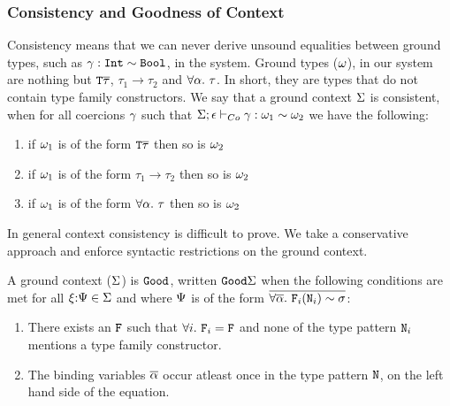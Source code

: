 \documentclass[format=sigplan,manuscript,review,screen,nonacm,margin=1in]{acmart}
\begin{document}
\subsubsection{Consistency and Goodness of Context}\label{subsec:tf-closed-consistency}
Consistency means that we can never derive unsound equalities between ground types,
such as $\gamma:\texttt{Int}\mathrel{\sim}\texttt{Bool}$, in the system. Ground types ($\omega$), in our system are
nothing but $\texttt{T}\overline{\tau}$, $\tau_1\to\tau_2$ and $\forall\alpha.~\tau$.
In short, they are types that do not contain type family constructors.
We say that a ground context $\Sigma$ is consistent, when for all coercions $\gamma$
such that $\Sigma;\epsilon \vdash_{Co} \gamma : \omega_1 \mathrel{\sim} \omega_2$ we have the following:
\begin{enumerate}
\item if $\omega_1$ is of the form $\texttt{T}\overline{\tau}$ then so is $\omega_2$
\item if $\omega_1$ is of the form $\tau_1\to\tau_2$ then so is $\omega_2$
\item if $\omega_1$ is of the form $\forall\alpha.~\tau$ then so is $\omega_2$
\end{enumerate}
In general context consistency is difficult to prove. We take a conservative approach
and enforce syntactic restrictions on the ground context.
\begin{property}[$\Good~\GEnv$]
  A ground context ($\Sigma$) is $\texttt{Good}$, written $\texttt{Good}\Sigma$ when
  the following conditions are met for all $\xi{:}\Psi\in\Sigma$ and
  where $\Psi$ is of the form $\overline{\forall\overline{\alpha}.~\texttt{F}_i(\texttt{N}_i)\mathrel{\sim}\sigma}$:
  \begin{enumerate}
  \item There exists an $\texttt{F}$ such that  $\forall i.~\texttt{F}_i = \texttt{F}$ and none of the type pattern $\texttt{N}_i$ mentions a type family constructor.
  \item The binding variables $\overline{\alpha}$ occur atleast once in the type pattern $\texttt{N}$,
    on the left hand side of the equation.
  \end{enumerate}
\end{property}
\end{document}
